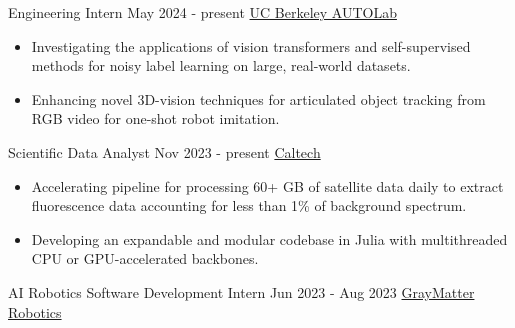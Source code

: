 \documentclass[9pt]{resume}
\begin{document}
    
    \vspace{0.3cm}

    \begin{experiencelist}
        \experience 
            {Engineering Intern} 
            {May 2024 - present}
            {\href{https://autolab.berkeley.edu/}{UC Berkeley AUTOLab}}
            {\begin{itemize}[noitemsep, topsep=1pt]
                \item Investigating the applications of vision transformers and self-supervised methods for noisy label learning on large, real-world datasets.
                \item Enhancing novel 3D-vision techniques for articulated object tracking from RGB video for one-shot robot imitation.
            \end{itemize}}
        \experience
            {Scientific Data Analyst}
            {Nov 2023 - present}
            {\href{https://www.gps.caltech.edu/}{Caltech}}
            {\begin{itemize}[noitemsep, topsep=1pt]
                \item Accelerating pipeline for processing 60+ GB of satellite data daily to extract fluorescence data accounting for less than 1\% of background spectrum.
                \item Developing an expandable and modular codebase in Julia with multithreaded CPU or GPU-accelerated backbones. 
            \end{itemize}}
        \experience 
            {AI Robotics Software Development Intern}
            {Jun 2023 - Aug 2023}
            {\href{https://graymatter-robotics.com/}{GrayMatter Robotics}}
            {\begin{itemize}[noitemsep, topsep=1pt]

\end{itemize}}
\end{experiencelist}
\end{document}
